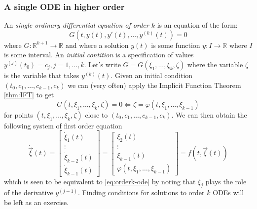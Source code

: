 \documentclass[10pt]{article}
\theoremstyle{definition}
\theoremstyle{remark}
\newcommand{\bbR}{\mathbb{R}}
\begin{document}
\subsubsection{A single ODE in higher order}
An \emph{single ordinary differential equation of order $k$} is an equation of the form:
\begin{equation}
  \label{eq:orderk-ode}
  G(t,y(t),y'(t),\ldots,y^{(k)}(t))=0
\end{equation}
where $G:\mathbb R^{k+1} \to \mathbb R$ and where a solution $y(t)$ is some function $y:I \to \bbR$ where $I$ is some interval. An \emph{initial contition} is a specification of values $y^{(j)}(t_0)=c_j, j=1,\ldots,k$. Let's write $G = G(\xi_1,\ldots,\xi_k,\zeta)$ where the variable $\zeta$ is the variable that takes $y^{(k)}(t)$. Given an initial condition $(t_0,c_1,\ldots,c_{k-1},c_k)$ we can (very often) apply the Implicit Function Theorem  \ref{thm:IFT} to get \[G(t,\xi_1,\ldots,\xi_k,\zeta)=0 \Leftrightarrow \zeta = \varphi(t,\xi_1,\ldots,\xi_{k-1})\] for points $(t,\xi_1,\ldots,\xi_k,\zeta)$ close to $(t_0,c_1,\ldots,c_{k-1},c_k)$. We can then obtain the following system of first order equation\[
  \dot{\vec\xi} (t) =
  \begin{bmatrix}
    \dot \xi_1(t) \\ \vdots \\\dot \xi_{k-2}(t) \\ \dot \xi_{k-1}(t)
  \end{bmatrix}
  =
  \begin{bmatrix}
    \xi_2(t) \\ \vdots \\ \xi_{k-1}(t) \\ \varphi(t,\xi_1,\ldots,\xi_{k-1})
  \end{bmatrix}
  = f(t,\vec \xi(t))
\] which is seen to be equivalent to \eqref{eq:orderk-ode} by noting that $\xi_j$ plays the role of the derivative $y^{(j-1)}$. Finding conditions for solutions to order $k$ ODEs will be left as an exercise.

 
\end{document}
